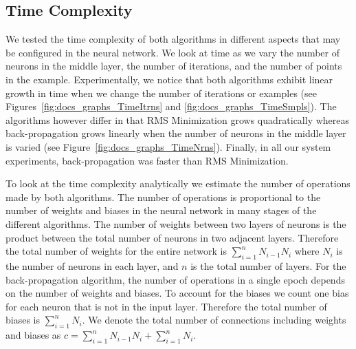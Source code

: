\documentclass[11pt]{article}
\begin{document}
\subsection{Time Complexity} %
\label{sub:time_complexity}

We tested the time complexity of both algorithms in different aspects that may be configured in the neural network. We look at time as
we vary the number of neurons in the middle layer, the number of iterations, and the number of points in the example. Experimentally, we
notice that both algorithms exhibit linear growth in time when we change the number of iterations or examples (see
Figures~\ref{fig:docs_graphs_TimeItrns} and \ref{fig:docs_graphs_TimeSmpls}). The algorithms however differ in that RMS Minimization
grows quadratically whereas back-propagation grows linearly when the number of neurons in the middle layer is varied (see
Figure~\ref{fig:docs_graphs_TimeNrns}). Finally, in all our system experiments, back-propagation was faster than RMS Minimization.

To look at the time complexity analytically we estimate the number of operations made by both algorithms. The number of operations is
proportional to the number of weights and biases in the neural network in many stages of the different algorithms. The number of weights
between two layers of neurons is the product between the total number of neurons in two adjacent layers. Therefore the total number of
weights for the entire network is $\sum_{i=1}^{n}N_{i-1}N_{i}$ where $N_{i}$ is the number of neurons in each layer, and $n$ is the
total number of layers. For the back-propagation algorithm, the number of operations in a single epoch depends on the number of weights
and biases. To account for the biases we count one bias for each neuron that is not in the input layer. Therefore the total number of
biases is $\sum_{i=1}^{n}N_{i}$. We denote the total number of connections including weights and biases as
$c=\sum_{i=1}^{n}N_{i-1}N_{i} + \sum_{i=1}^{n}N_{i}$.
\end{document}
